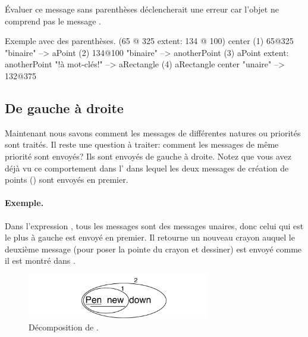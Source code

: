 \documentclass[a4paper,10pt,twoside]{book}
\begin{document}
\'Evaluer ce message sans parenth\`eses d\'eclencherait une erreur car
l'objet  ne comprend pas le message .

\begin{example}[decExtent]{Exemple avec des parenth\`eses.}{}
      (65 @ 325 extent: 134 @ 100) center
(1)   65@325                                                    "binaire"
    --> aPoint
(2)                                134@100                     "binaire"
                                 --> anotherPoint
(3)   aPoint extent: anotherPoint                       "!\`a mot-cl\'es!"
      --> aRectangle
(4)   aRectangle center                                     "unaire"
      --> 132@375
\end{example}

\subsection{De gauche \`a droite}
Maintenant nous savons comment les messages de diff\'erentes natures
ou priorit\'es sont trait\'es. Il reste une question \`a traiter:
comment les messages de m\^eme priorit\'e sont envoy\'es? Ils sont
envoy\'es de gauche \`a droite. Notez que vous avez d\'ej\`a vu ce
comportement dans l' dans lequel les deux messages de
cr\'eation de points () sont envoy\'es en premier.



\paragraph{Exemple.} Dans l'expression , tous les
messages sont des messages unaires, donc celui qui est le plus \`a
gauche  est envoy\'e en premier. Il retourne un nouveau
crayon auquel le deuxi\`eme message  
(pour poser la pointe du crayon et dessiner)
est envoy\'e comme il est montr\'e dans .

\begin{figure}
	\centering
	\includegraphics[width=8cm]{ucompoUn}
	\caption{D\'ecomposition de .\label{fig:unaryMessages}}
\end{figure}
\end{document}
